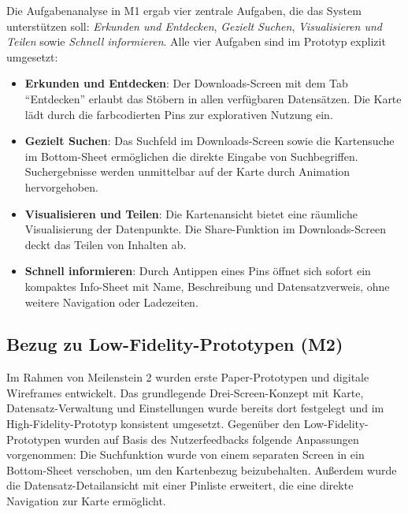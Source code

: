 Die Aufgabenanalyse in M1 ergab vier zentrale Aufgaben, die das System unterstützen soll:
\textit{Erkunden und Entdecken}, \textit{Gezielt Suchen}, \textit{Visualisieren und Teilen} sowie \textit{Schnell informieren}.
Alle vier Aufgaben sind im Prototyp explizit umgesetzt:

\begin{itemize}
    \item \textbf{Erkunden und Entdecken}: Der Downloads-Screen mit dem Tab \enquote{Entdecken} erlaubt das Stöbern in allen verfügbaren Datensätzen. Die Karte lädt durch die farbcodierten Pins zur explorativen Nutzung ein.
    \item \textbf{Gezielt Suchen}: Das Suchfeld im Downloads-Screen sowie die Kartensuche im Bottom-Sheet ermöglichen die direkte Eingabe von Suchbegriffen. Suchergebnisse werden unmittelbar auf der Karte durch Animation hervorgehoben.
    \item \textbf{Visualisieren und Teilen}: Die Kartenansicht bietet eine räumliche Visualisierung der Datenpunkte. Die Share-Funktion im Downloads-Screen deckt das Teilen von Inhalten ab.
    \item \textbf{Schnell informieren}: Durch Antippen eines Pins öffnet sich sofort ein kompaktes Info-Sheet mit Name, Beschreibung und Datensatzverweis, ohne weitere Navigation oder Ladezeiten.
\end{itemize}

\subsection{Bezug zu Low-Fidelity-Prototypen (M2)}

Im Rahmen von Meilenstein 2 wurden erste Paper-Prototypen und digitale Wireframes entwickelt.
Das grundlegende Drei-Screen-Konzept mit Karte, Datensatz-Verwaltung und Einstellungen wurde bereits dort festgelegt und im High-Fidelity-Prototyp konsistent umgesetzt.
Gegenüber den Low-Fidelity-Prototypen wurden auf Basis des Nutzerfeedbacks folgende Anpassungen vorgenommen:
Die Suchfunktion wurde von einem separaten Screen in ein Bottom-Sheet verschoben, um den Kartenbezug beizubehalten.
Außerdem wurde die Datensatz-Detailansicht mit einer Pinliste erweitert, die eine direkte Navigation zur Karte ermöglicht.
